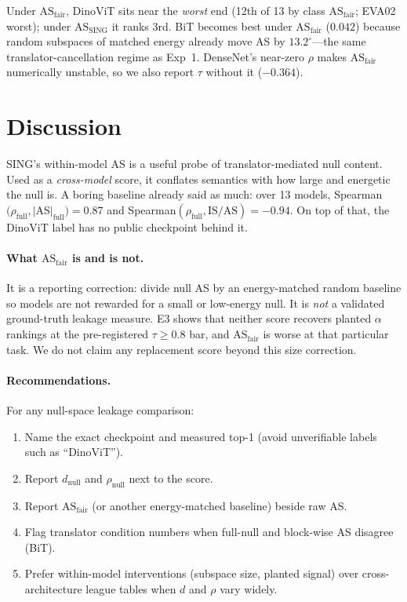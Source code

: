 \documentclass[10pt,twocolumn]{article}
\begin{document}
Under $\mathrm{AS}_{\mathrm{fair}}$, DinoViT sits near the \emph{worst} end (12th of 13 by class $\mathrm{AS}_{\mathrm{fair}}$; EVA02 worst); under $\mathrm{AS}_{\mathrm{SING}}$ it ranks 3rd.
BiT becomes best under $\mathrm{AS}_{\mathrm{fair}}$ ($0.042$) because random subspaces of matched energy already move AS by $13.2^\circ$---the same translator-cancellation regime as Exp~1.
DenseNet's near-zero $\rho$ makes $\mathrm{AS}_{\mathrm{fair}}$ numerically unstable, so we also report $\tau$ without it (${-}0.364$).

\section{Discussion}
\vspace{-0.2em}
SING's within-model AS is a useful probe of translator-mediated null content. Used as a \emph{cross-model} score, it conflates semantics with how large and energetic the null is.
A boring baseline already said as much: over 13 models, Spearman$(\rho_{\mathrm{full}},|$AS$|_{\mathrm{full}}){=}0.87$ and Spearman$(\rho_{\mathrm{full}},\mathrm{IS}/\mathrm{AS}){=}{-}0.94$.
On top of that, the DinoViT label has no public checkpoint behind it.

\paragraph{What $\mathrm{AS}_{\mathrm{fair}}$ is and is not.}
It is a reporting correction: divide null AS by an energy-matched random baseline so models are not rewarded for a small or low-energy null.
It is \emph{not} a validated ground-truth leakage measure. E3 shows that neither score recovers planted $\alpha$ rankings at the pre-registered $\tau\ge0.8$ bar, and $\mathrm{AS}_{\mathrm{fair}}$ is worse at that particular task.
We do not claim any replacement score beyond this size correction.

\paragraph{Recommendations.}
For any null-space leakage comparison:
\begin{enumerate}
\item Name the exact checkpoint and measured top-1 (avoid unverifiable labels such as ``DinoViT'').
\item Report $d_{\mathrm{null}}$ and $\rho_{\mathrm{null}}$ next to the score.
\item Report $\mathrm{AS}_{\mathrm{fair}}$ (or another energy-matched baseline) beside raw AS.
\item Flag translator condition numbers when full-null and block-wise AS disagree (BiT).
\item Prefer within-model interventions (subspace size, planted signal) over cross-architecture league tables when $d$ and $\rho$ vary widely.
\end{enumerate}
\end{document}
